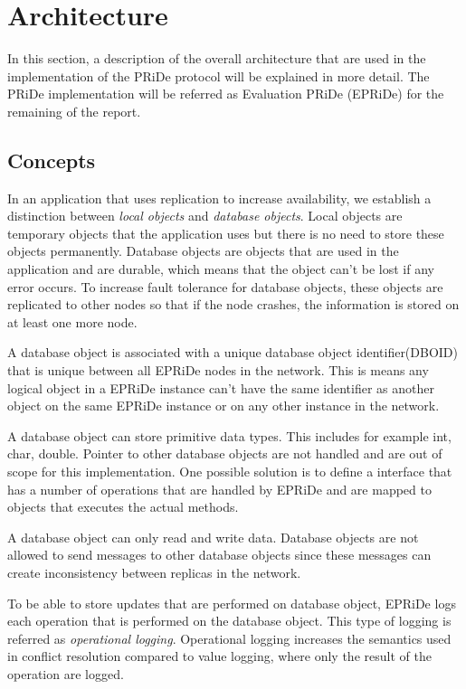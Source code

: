 
\section{Architecture} %
\label{sec:arch}

In this section, a description of the overall architecture that are used in the implementation of the PRiDe protocol will be explained in more detail. The PRiDe implementation will be referred as Evaluation PRiDe (EPRiDe) for the remaining of the report.  


\subsection{Concepts} %
\label{sub:consepts}

In an application that uses replication to increase availability, we establish a distinction between \emph{local objects} and \emph{database objects}. Local objects are temporary objects that the application uses but there is no need to store these objects permanently. Database objects are objects that are used in the application and are durable, which means that the object can't be lost if any error occurs. To increase fault tolerance for database objects, these objects are replicated to other nodes so that if the node crashes, the information is stored on at least one more node. 

A database object is associated with a unique database object identifier(DBOID) that is unique between all EPRiDe nodes in the network. This is means any logical object in a EPRiDe instance can't have the same identifier as another object on the same EPRiDe instance or on any other instance in the network.    

A database object can store primitive data types. This includes for example int, char, double. Pointer to other database objects are not handled and are out of scope for this implementation. One possible solution is to define a interface that has a number of operations that are handled by EPRiDe and are mapped to objects that executes the actual methods.  

A database object can only read and write data. Database objects are not allowed to send messages to other database objects since these messages can create inconsistency between replicas in the network.

To be able to store updates that are performed on database object, EPRiDe logs each operation that is performed on the database object. This type of logging is referred as \emph{operational logging}. Operational logging increases the semantics used in conflict resolution compared to value logging, where only the result of the operation are logged. 

